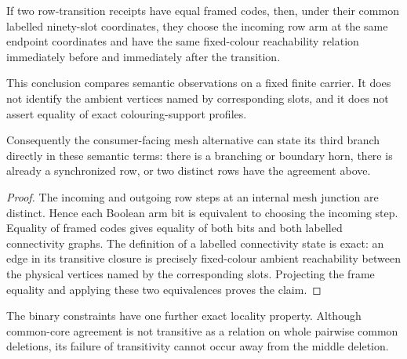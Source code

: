 \begin{lemma}
\label{lem:fixed-colour-transition-frame-semantics}
If two row-transition receipts have equal framed codes, then, under their
common labelled ninety-slot coordinates, they choose the incoming row arm at
the same endpoint coordinates and have the same fixed-colour reachability
relation immediately before and immediately after the transition.

This conclusion compares semantic observations on a fixed finite carrier.  It
does not identify the ambient vertices named by corresponding slots, and it
does not assert equality of exact colouring-support profiles.

Consequently the consumer-facing mesh alternative can state its third branch
directly in these semantic terms: there is a branching or boundary horn, there
is already a synchronized row, or two distinct rows have the agreement above.
\end{lemma}

\begin{proof}
The incoming and outgoing row steps at an internal mesh junction are distinct.
Hence each Boolean arm bit is equivalent to choosing the incoming step.
Equality of framed codes gives equality of both bits and both labelled
connectivity graphs.  The definition of a labelled connectivity state is
exact: an edge in its transitive closure is precisely fixed-colour ambient
reachability between the physical vertices named by the corresponding slots.
Projecting the frame equality and applying these two equivalences proves the
claim.
\end{proof}

The binary constraints have one further exact locality property.  Although
common-core agreement is not transitive as a relation on whole pairwise
common deletions, its failure of transitivity cannot occur away from the
middle deletion.

